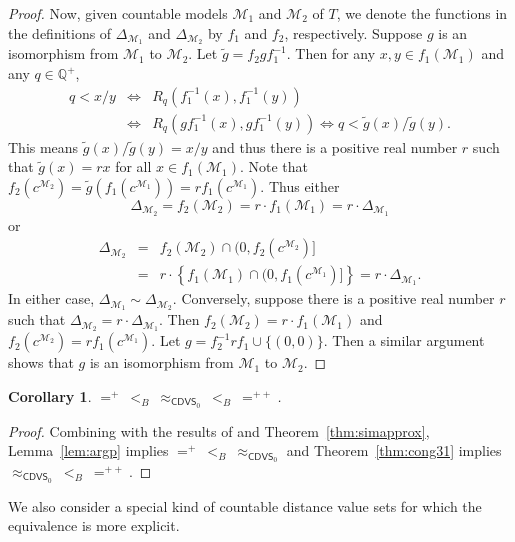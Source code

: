 \documentclass{amsart}
\newtheorem{corollary}[theorem]{Corollary}
\theoremstyle{definition}
\theoremstyle{remark}
\begin{document}
\begin{proof}
Now, given countable models $\mathcal{M}_1$ and $\mathcal{M}_2$ of $T$, we denote the functions in the definitions of $\Delta_{\mathcal{M}_1}$ and $\Delta_{\mathcal{M}_2}$ by $f_1$ and $f_2$, respectively. Suppose $g$ is an isomorphism from $\mathcal{M}_1$ to $\mathcal{M}_2$. 
    Let $\tilde{g}=f_2gf_1^{-1}$. Then for any $x,y \in f_1(\mathcal{M}_1)$ and any $q\in\mathbb{Q}^+$, 
$$ \begin{array}{rcl} q<x/y &\iff& R_q(f_1^{-1}(x),f_1^{-1}(y)) \\
&\iff& R_q(gf_1^{-1}(x),gf_1^{-1}(y)) \iff q<\tilde{g}(x)/\tilde{g}(y).
\end{array}$$ 
This means $\tilde{g}(x)/\tilde{g}(y)=x/y$ and thus there is a positive real number $r$ such that $\tilde{g}(x)=r x$ for all $x\in f_1(\mathcal{M}_1)$. Note that $f_2(c^{\mathcal{M}_2})=\tilde{g}(f_1(c^{\mathcal{M}_1}))=r f_1(c^{\mathcal{M}_1})$. Thus either 
$$\Delta_{\mathcal{M}_2}=f_2(\mathcal{M}_2)=r\cdot f_1(\mathcal{M}_1)=r\cdot \Delta_{\mathcal{M}_1}$$ or
$$\begin{array}{rcl}\Delta_{\mathcal{M}_2}&=&f_2(\mathcal{M}_2)\cap (0,f_2(c^{\mathcal{M}_2})]\\
&=&r\cdot \left\{f_1(\mathcal{M}_1)\cap (0,f_1(c^{\mathcal{M}_1})]\right\}=r\cdot \Delta_{\mathcal{M}_1}.
\end{array}$$ 
In either case, $\Delta_{\mathcal{M}_1}\sim\Delta_{\mathcal{M}_2}$. Conversely, suppose there is a positive real number $r$ such that $\Delta_{\mathcal{M}_2}=r\cdot\Delta_{\mathcal{M}_1}$. Then $f_2(\mathcal{M}_2)=r\cdot f_1(\mathcal{M}_1)$ and $f_2(c^{\mathcal{M}_2})=r f_1(c^{\mathcal{M}_1})$. Let $g=f_2^{-1}r f_1\cup\{(0,0)\}$. Then a similar argument shows that $g$ is an isomorphism from $\mathcal{M}_1$ to $\mathcal{M}_2$. 
\end{proof}

\begin{corollary} $=^+\ <_B\ \approx_{\mathsf{CDVS}_0}\ <_B\ =^{++}$.
\end{corollary}

\begin{proof} Combining with the results of \cite{CMMRS} and Theorem~\ref{thm:simapprox}, Lemma~\ref{lem:argp} implies $=^+\ <_B\ \approx_{\mathsf{CDVS}_0}$ and Theorem~\ref{thm:cong31} implies $\approx_{\mathsf{CDVS}_0}\ <_B\ =^{++}$.
\end{proof}

We also consider a special kind of countable distance value sets for which the equivalence is more explicit.
\end{document}
